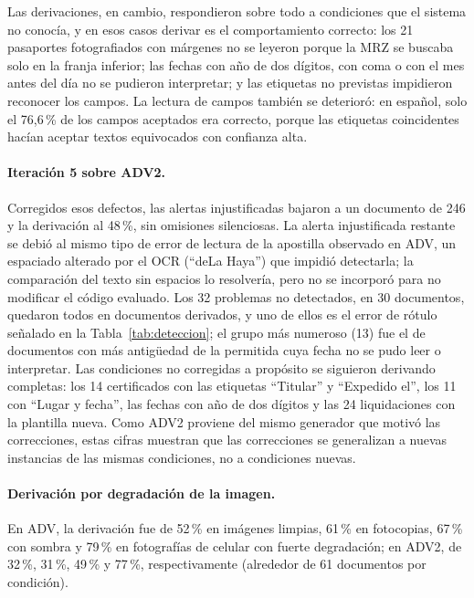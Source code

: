 \documentclass[11pt,a4paper]{article}
\begin{document}
Las derivaciones, en cambio, respondieron sobre todo a condiciones que el sistema no conocía, y en esos casos derivar es el comportamiento correcto: los 21 pasaportes fotografiados con márgenes no se leyeron porque la MRZ se buscaba solo en la franja inferior; las fechas con año de dos dígitos, con coma o con el mes antes del día no se pudieron interpretar; y las etiquetas no previstas impidieron reconocer los campos. La lectura de campos también se deterioró: en español, solo el 76,6\,\% de los campos aceptados era correcto, porque las etiquetas coincidentes hacían aceptar textos equivocados con confianza alta.

\paragraph{Iteración 5 sobre ADV2.} Corregidos esos defectos, las alertas injustificadas bajaron a un documento de 246 y la derivación al 48\,\%, sin omisiones silenciosas. La alerta injustificada restante se debió al mismo tipo de error de lectura de la apostilla observado en ADV, un espaciado alterado por el OCR (``deLa Haya'') que impidió detectarla; la comparación del texto sin espacios lo resolvería, pero no se incorporó para no modificar el código evaluado. Los 32 problemas no detectados, en 30 documentos, quedaron todos en documentos derivados, y uno de ellos es el error de rótulo señalado en la Tabla~\ref{tab:deteccion}; el grupo más numeroso (13) fue el de documentos con más antigüedad de la permitida cuya fecha no se pudo leer o interpretar. Las condiciones no corregidas a propósito se siguieron derivando completas: los 14 certificados con las etiquetas ``Titular'' y ``Expedido el'', los 11 con ``Lugar y fecha'', las fechas con año de dos dígitos y las 24 liquidaciones con la plantilla nueva. Como ADV2 proviene del mismo generador que motivó las correcciones, estas cifras muestran que las correcciones se generalizan a nuevas instancias de las mismas condiciones, no a condiciones nuevas.

\paragraph{Derivación por degradación de la imagen.}\label{sec:degradacion} En ADV, la derivación fue de 52\,\% en imágenes limpias, 61\,\% en fotocopias, 67\,\% con sombra y 79\,\% en fotografías de celular con fuerte degradación; en ADV2, de 32\,\%, 31\,\%, 49\,\% y 77\,\%, respectivamente (alrededor de 61 documentos por condición).
\end{document}

